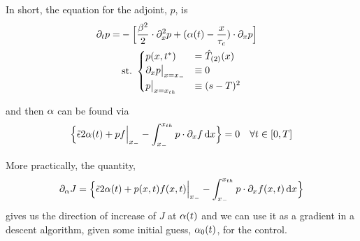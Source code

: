 \documentclass{article}
\begin{document}
In short, the equation for the adjoint, $p$, is 
\begin{equation}
\begin{gathered}
\begin{aligned}
{\partial}_t p =&   
			- \Big[ \frac{{\beta}^2 }{2}\cdot {\partial}^2_x p +  
			({\alpha}(t)- \frac{x}{{ \tau_{c} }})  \cdot {\partial}_x p \Big] 
\end{aligned}
\\
{ \textrm{st.\ } }  
\begin{cases}
	p(x,{ t^* }) &= { \hat{T}_{(2)} }(x)
	\\ 
	{\partial}_x p  \big|_{x={ x_{-} }} &\equiv 0
	\\
	p \big|_{x={ x_{th} }} &\equiv (s-T)^2
\end{cases}
\label{eq:adjoint_pde_OU}
\end{gathered}
\end{equation} 

and then ${\alpha}$ can be found via
\begin{equation}
\Big\{
 \tilde{{\epsilon}}  2 {\alpha}(t)
+ p f \Big|_{ x_{-} }
- \int _{ x_{-} }^{ x_{th} } p \cdot {\partial}_x f \, \mathrm{d} x 
\Big\} = 0
\quad \forall t \in [0,T]
\label{eq:J_necessary_condition}
\end{equation}

More practically, the quantity, 
$${\partial}_{\alpha} J =  \Big\{
 \tilde{{\epsilon}}  2 {\alpha}(t)
+ p(x,t) f(x,t) \Big|_{ x_{-} }
- \int _{ x_{-} }^{ x_{th} } p \cdot {\partial}_x f(x,t) \, \mathrm{d} x 
\Big\}
$$
gives us the direction of increase of $J$ at ${\alpha}(t)$
and we can use it as a gradient in a descent algorithm, given some initial
guess, ${\alpha}_0(t)$, for the control.
\end{document}

